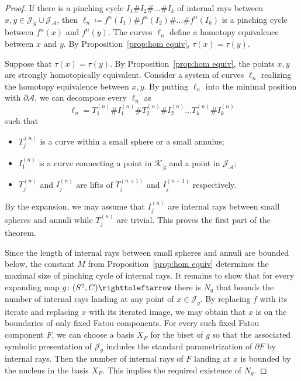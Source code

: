 \documentclass{amsart}
\theoremstyle{plain}
\theoremstyle{definition}
\theoremstyle{remark}
\renewcommand{\AA}{{\mathcal A}}
\newcommand{\filled}{{\mathcal K}}
\newcommand{\reminder}[1]{\textsl{$\lhd\rhd$#1$\lhd\rhd$}\marginpar{$\lhd\rhd\lhd\rhd\lhd\rhd$}}%
\newcommand{\hide}[1]{}
\newcommand{\Jul}{{\mathcal J}}
\newcommand\selfmap{\righttoleftarrow}
\begin{document}
\begin{proof}
If there is a pinching cycle $I_1\# I_2\# \dots \# I_k$ of internal rays between $x, y\in \Jul_{\widetilde S} \cup \Jul_\AA$, then $\ell_n\coloneq  f^n(I_1)\#f^n(I_2)\#\dots \# f^n(I_k)$ is a pinching cycle between $f^n(x)$ and $f^n(y)$. The curves $\ell_n$ define a homotopy equivalence between $x$ and $y$. By Proposition~\ref{prop:hom equiv}, $\tau(x)=\tau(y)$.

Suppose that $\tau(x)=\tau(y)$.  By Proposition~\ref{prop:hom equiv}, the points $x,y$ are strongly homotopically equivalent. Consider a system of curves $\ell_n$ realizing the homotopy equivalence between $x,y$. By putting $\ell_n$ into the minimal position with $\partial \AA$, we can decompose every $\ell_n$ as \[\ell_n = T^{(n)}_1\#I^{(n)}_1\#T^{(n)}_2\#I^{(n)}_2 \dots T^{(n)}_k\#I^{(n)}_k \]
such that
\begin{itemize}
\item $T^{(n)}_j$ is a curve within a small sphere or a small annulus;
\item $I^{(n)}_1$ is a curve connecting a point in $\filled_{\widetilde S}$ and a point in $\Jul_\AA$; 
\item $T^{(n)}_j$ and $I^{(n)}_j$ are lifts of $T^{(n+1)}_j$ and $I^{(n+1)}_j$ respectively. 
\end{itemize}
By the expansion, we may assume that $I^{(n)}_j$ are internal rays between small spheres and annuli while $T^{(n)}_j$ are trivial. This proves the first part of the theorem.

Since the length of internal rays between small spheres and annuli are bounded below, the constant $M$ from Proposition~\ref{prop:hom equiv} determines the maximal size of pinching cycle of internal rays. It remains to show that for every expanding map $g\colon(S^2,C)\selfmap$ there is $N_g$ that bounds the number of internal rays landing at any point of $x\in\Jul_g$. By replacing $f$ with its iterate and replacing $x$ with its iterated image, we may obtain that $x$ is on the boundaries of only fixed Fatou components. For every such fixed Fatou component $F$, we can choose a basis $X_F$ for the biset of $g$ so that the associated symbolic presentation of $\Jul_g$ includes the standard parametrization of $\partial F$ by internal rays. Then the number of internal rays of $F$ landing at $x$ is bounded by the nucleus in the basis $X_F$. This implies the required existence of $N_g$. %
\end{proof}
\end{document}
